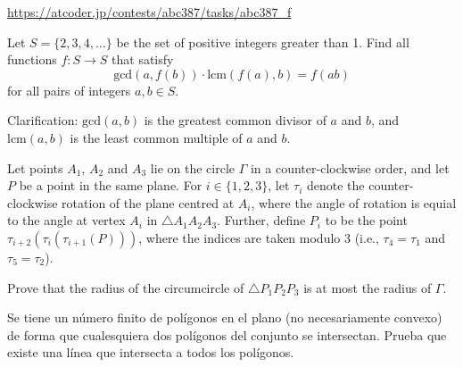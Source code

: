 \documentclass[11pt]{scrartcl}
\begin{document}
\begin{problem}[AC ABC387F]
\url{https://atcoder.jp/contests/abc387/tasks/abc387_f}
\end{problem}
\begin{problem}[Rioplatense 2024/3.5]
    Let $S = \{2, 3, 4, \dots\}$ be the set of positive integers greater than 1. Find all functions $f : S \to S$ that satisfy
\[
\text{gcd}(a, f(b)) \cdot \text{lcm}(f(a), b) = f(ab)
\]for all pairs of integers $a, b \in S$.

Clarification: $\text{gcd}(a,b)$ is the greatest common divisor of $a$ and $b$, and $\text{lcm}(a,b)$ is the least common multiple of $a$ and $b$.
\end{problem}
\begin{problem}[India 2024/5]
Let points $A_1$, $A_2$ and $A_3$ lie on the circle $\Gamma$ in a counter-clockwise order, and let $P$ be a point in the same plane. For $i \in \{1,2,3\}$, let $\tau_i$ denote the counter-clockwise rotation of the plane centred at $A_i$, where the angle of rotation is equial to the angle at vertex $A_i$ in $\triangle A_1A_2A_3$. Further, define $P_i$ to be the point $\tau_{i+2}(\tau_{i}(\tau_{i+1}(P)))$, where the indices are taken modulo $3$ (i.e., $\tau_4 = \tau_1$ and $\tau_5 = \tau_2$).

Prove that the radius of the circumcircle of $\triangle P_1P_2P_3$ is at most the radius of $\Gamma$.
\end{problem}
\begin{problem}
Se tiene un número finito de polígonos en el plano (no necesariamente convexo) de forma que cualesquiera dos polígonos del conjunto se intersectan. Prueba que existe una línea que intersecta a todos los polígonos.
\end{problem}
\end{document}
